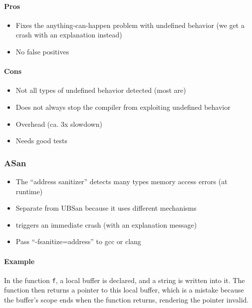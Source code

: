 \documentclass[12pt]{article}
\begin{document}
\paragraph{Pros}

\begin{itemize}
    \item Fixes the anything-can-happen problem with undefined behavior (we get a crash with an explanation instead)
    \item No false positives
\end{itemize}

\paragraph{Cons}

\begin{itemize}
    \item Not all types of undefined behavior detected (most are)
    \item Does not always stop the compiler from exploiting undefined behavior
    \item Overhead (ca. 3x slowdown)
    \item Needs good tests
\end{itemize}

\subsubsection{ASan}

\begin{itemize}
    \item The ``address sanitizer'' detects many types memory access errors (at runtime)
    \item Separate from UBSan because it uses different mechanisms
    \item triggers an immediate crash (with an explanation message)
    \item Pass ``-fsanitize=address'' to gcc or clang
\end{itemize}

\paragraph{Example}
In the function \texttt{f}, a local buffer is declared, and a string is written into it. The function then returns a pointer to this local buffer, which is a mistake because the buffer's scope ends when the function returns, rendering the pointer invalid.
\end{document}
